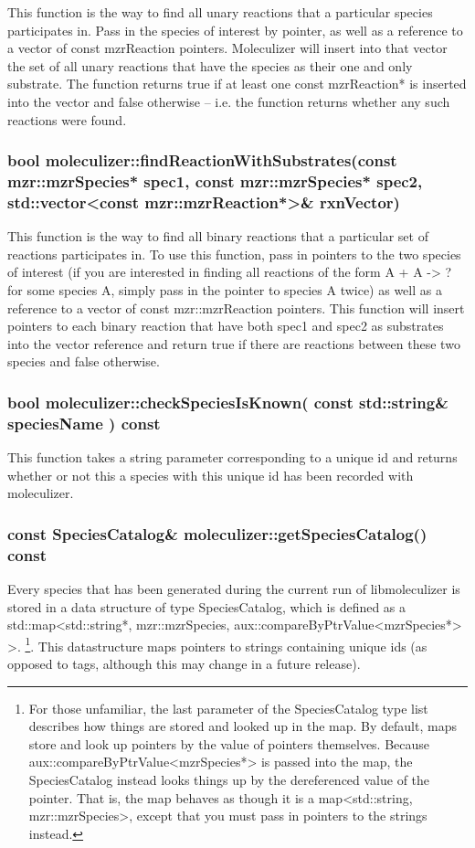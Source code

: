 This function is the way to find all unary reactions that a particular
species participates in.  Pass in the species of interest by pointer,
as well as a reference to a vector of const mzrReaction pointers.
Moleculizer will insert into that vector the set of all unary
reactions that have the species as their one and only substrate.  The
function returns true if at least one const mzrReaction* is inserted
into the vector and false otherwise -- i.e. the function returns
whether any such reactions were found.  


\subsubsection{bool moleculizer::findReactionWithSubstrates(const
  mzr::mzrSpecies* spec1, const mzr::mzrSpecies* spec2,
  std::vector<const mzr::mzrReaction*>\& rxnVector)}

This function is the way to find all binary reactions that a
particular set of reactions participates in.  To use this function,
pass in pointers to the two species of interest (if you are interested
in finding all reactions of the form A + A -> ? for some species A,
simply pass in the pointer to species A twice) as well as a reference
to a vector of const mzr::mzrReaction pointers.  This function will
insert pointers to each binary reaction that have both spec1 and spec2
as substrates into the vector reference and return true if there are
reactions between these two species and false otherwise.  

\subsubsection{ bool moleculizer::checkSpeciesIsKnown( const
  std::string\& speciesName ) const}
This function takes a string parameter corresponding to a unique id
and returns whether or not this a species with this unique id has been
recorded with moleculizer.

\subsubsection{const SpeciesCatalog\& moleculizer::getSpeciesCatalog()
  const }
Every species that has been generated during the current run of
libmoleculizer is stored in a data structure of type SpeciesCatalog,
which is defined as a std::map<std::string*, mzr::mzrSpecies,
aux::compareByPtrValue<mzrSpecies*> >.  \footnote{For those unfamiliar, the
last parameter of the SpeciesCatalog type list describes how things
are stored and looked up in the map.  By default, maps store and look
up pointers by the value of pointers themselves.  Because
aux::compareByPtrValue<mzrSpecies*> is passed into the map, the
SpeciesCatalog instead looks things up by the dereferenced value of
the pointer.  That is, the map behaves as though it is a
map<std::string, mzr::mzrSpecies>, except that you must pass in
pointers to the strings instead.}.  This datastructure maps pointers
to strings containing unique ids (as opposed to tags, although this
may change in a future release).  

